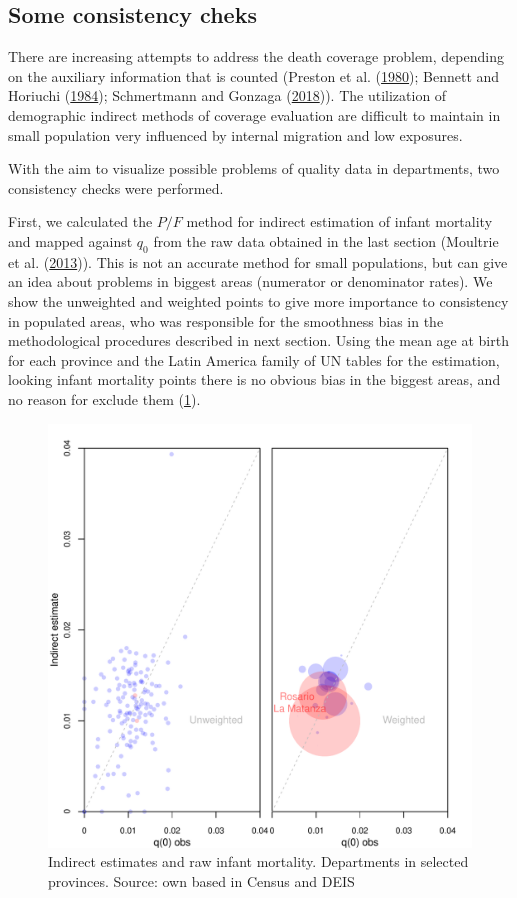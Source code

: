 \documentclass[12pt,]{article}
\begin{document}
\hypertarget{some-consistency-cheks}{%
\subsection{\texorpdfstring{\textbf{Some consistency
cheks}}{Some consistency cheks}}\label{some-consistency-cheks}}

There are increasing attempts to address the death coverage problem,
depending on the auxiliary information that is counted (Preston et al.
(\protect\hyperlink{ref-Preston1980}{1980}); Bennett and Horiuchi
(\protect\hyperlink{ref-Bennett_Horiuchi_1984}{1984}); Schmertmann and
Gonzaga (\protect\hyperlink{ref-Schmertmann2018}{2018})). The
utilization of demographic indirect methods of coverage evaluation are
difficult to maintain in small population very influenced by internal
migration and low exposures.

With the aim to visualize possible problems of quality data in
departments, two consistency checks were performed.

First, we calculated the \(P/F\) method for indirect estimation of
infant mortality and mapped against \(q_0\) from the raw data obtained
in the last section (Moultrie et al.
(\protect\hyperlink{ref-Moultrie}{2013})). This is not an accurate
method for small populations, but can give an idea about problems in
biggest areas (numerator or denominator rates). We show the unweighted
and weighted points to give more importance to consistency in populated
areas, who was responsible for the smoothness bias in the methodological
procedures described in next section. Using the mean age at birth for
each province and the Latin America family of UN tables for the
estimation, looking infant mortality points there is no obvious bias in
the biggest areas, and no reason for exclude them (\ref{fig:PF}).

\begin{figure}

{\centering \includegraphics[width=0.7\linewidth]{plots/ChekPF} 

}

\caption{Indirect estimates and raw infant mortality. Departments in selected provinces. Source: own based in Census and DEIS}\label{fig:PF}
\end{figure}
\end{document}
